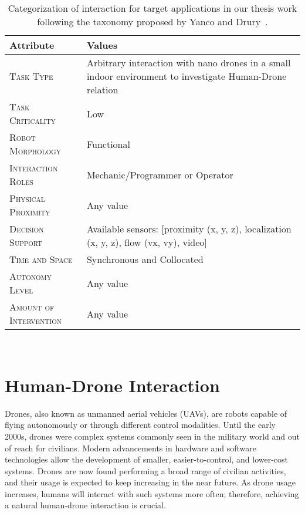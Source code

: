 \begin{table}[tb]
\centering
    \begin{tabular}{|p{}|m{}|}
    \hline
    \rowcolor{bluepoli!40}
    \textbf{Attribute} & \textbf{Values} \\
    \hline \hline
    {\scshape Task Type} & Arbitrary interaction with nano drones in a small indoor environment to investigate Human-Drone relation \\
    \hline
    {\scshape Task Criticality} & Low \\
    \hline
    {\scshape Robot Morphology} & Functional \\
    \hline
    {\scshape Interaction Roles} & Mechanic/Programmer or Operator \\
    \hline
    {\scshape Physical Proximity} &  Any value \\
    \hline
    {\scshape Decision Support} & Available sensors: [proximity (x, y, z), localization (x, y, z), flow (vx, vy), video] \\
    \hline
    {\scshape Time and Space} & Synchronous and Collocated \\
    \hline
    {\scshape Autonomy Level} & Any value \\
    \hline
    {\scshape Amount of Intervention} & Any value \\
    \hline
    \end{tabular}
    \\[10pt]
    \caption[Taxonomy for interaction of target applications]{Categorization of interaction for target applications in our thesis work following the taxonomy proposed by Yanco and Drury~\cite{yanco2004taxonomy}.}\label{table:taxonomy_target}
\end{table}


\section{Human-Drone Interaction}\label{sec:soa_hdi}
Drones, also known as unmanned aerial vehicles (UAVs), are robots capable of flying autonomously or through different control modalities.
Until the early 2000s, drones were complex systems commonly seen in the military world and out of reach for civilians. 
Modern advancements in hardware and software technologies allow the development of smaller, easier-to-control, and lower-cost systems.
Drones are now found performing a broad range of civilian activities, and their usage is expected to keep increasing in the near future.
As drone usage increases, humans will interact with such systems more often; therefore, achieving a natural human-drone interaction is crucial.

